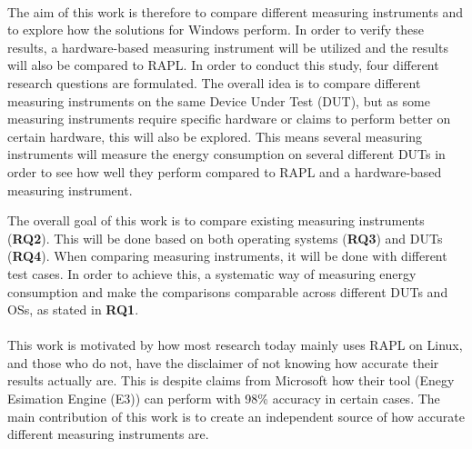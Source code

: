 \paragraph*{}
The aim of this work is therefore to compare different measuring instruments and to explore how the solutions for Windows perform. In order to verify these results, a hardware-based measuring instrument will be utilized and the results will also be compared to RAPL. In order to conduct this study, four different research questions are formulated. The overall idea is to compare different measuring instruments on the same Device Under Test (DUT), but as some measuring instruments require specific hardware or claims to perform better on certain hardware, this will also be explored. This means several measuring instruments will measure the energy consumption on several different DUTs in order to see how well they perform compared to RAPL and a hardware-based measuring instrument.



The overall goal of this work is to compare existing measuring instruments (\textbf{RQ2}). This will be done based on both operating systems (\textbf{RQ3}) and DUTs (\textbf{RQ4}). When comparing measuring instruments, it will be done with different test cases. In order to achieve this, a systematic way of measuring energy consumption and make the comparisons comparable across different DUTs and OSs, as stated in \textbf{RQ1}.

\paragraph*{}
This work is motivated by how most research today mainly uses RAPL on Linux\cite[]{Rasmussen2021,Pereira2017,Theilmann2022,Lindholt2022}, and those who do not, have the disclaimer of not knowing how accurate their results actually are\cite[]{Bruce2015ReducingEC, Ozturk2019, Unlu2021}. This is despite claims from Microsoft how their tool (Enegy Esimation Engine (E3)) can perform with 98\% accuracy in certain cases\cite[]{E3WinHec}. The main contribution of this work is to create an independent source of how accurate different measuring instruments are.

